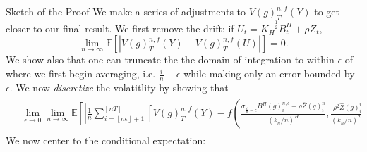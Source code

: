 \documentclass[final,hyperref={pdfpagelabels=false}]{beamer}
\newcommand{\E}{\mathbb{E}}
\begin{document}
\begin{frame}{}
\begin{columns}[t]
\begin{column}{0.4\linewidth}
        \begin{block}{Sketch of the Proof}
          We make a series of adjustments to \(V(g)^{n,f}_T(Y)\) to get closer to our final result. We first remove the drift: if \(U_t = K_H^{-\frac{1}{2}}B^H_t + \rho Z_t\),
          \begin{equation*}
            \lim_{n \rightarrow \infty} \E\left[ \left| V(g)^{n,f}_T(Y) - V(g)^{n,f}_T(U) \right| \right] = 0.
          \end{equation*}
          We show also that one can truncate the the domain of integration to within \(\epsilon\) of where we first begin averaging, i.e. \(\frac{i}{n} - \epsilon\) while making only an error bounded by \(\epsilon\).
          We now \textit{discretize} the volatitlity by showing that
          \begin{align*}
            \phantom{}
            \begin{aligned}
      &\lim_{\epsilon \rightarrow 0}\lim_{n \rightarrow \infty}\E \left[ \left| \frac{1}{n}\sum_{i=\left\lfloor n\epsilon \right\rfloor + 1}^{\left\lfloor nT \right\rfloor} \left[ V(g)^{n,f}_T(Y) \right. \right. \right. - \left. \left. \left. f\left( \frac{\sigma_{\frac{i}{n}-\epsilon}\overline{B^H}(g)^{n,\epsilon}_i + \rho\overline{Z}(g)^n_i}{(k_n/n)^{H}}, \frac{\rho^2\widehat{Z}(g)^n_i}{(k_n/n)^{2H}}\right) \right] \right| \right] = 0
            \end{aligned}
          \end{align*}
          We now center to the conditional expectation:

\end{block}
\end{column}
\end{columns}
\end{frame}
\end{document}
